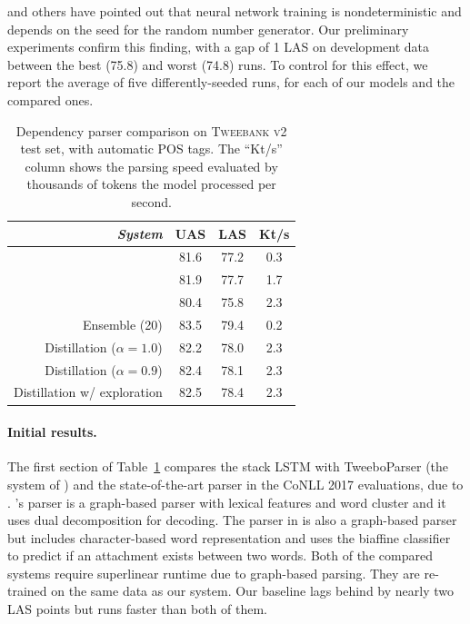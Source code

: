\documentclass[11pt,a4paper]{article}
\begin{document}
\citet{reimers-gurevych:2017:EMNLP2017} and others have
pointed out that neural network training is 
nondeterministic and depends on the seed for the random
number generator.
Our preliminary experiments confirm this finding, with a gap of 1 LAS on development data
between the best (75.8)
 and worst (74.8) runs. To control for this
effect, we report the average of five differently-seeded runs, for
each of our models and the compared ones.

\begin{table}[t]
	\centering
	\begin{tabular}{rccc}
		\hline
		\it System & UAS & LAS & Kt/s \\
		\hline
		\citet{kong-EtAl:2014:EMNLP2014} &81.6 & 77.2 & 0.3 \\
		\citet{dozat-qi-manning:2017:K17-3} & 81.9 &  77.7 & 1.7 \\
		\newcite{ballesteros-EtAl:2016:EMNLP2016} & 80.4 & 75.8 & 2.3 \\
		\hdashline
		Ensemble (20) & 83.5 & 79.4 & 0.2 \\
		Distillation ($\alpha =1.0$) & 82.2 & 78.0 & 2.3 \\
		Distillation ($\alpha =0.9$) & 82.4 & 78.1 & 2.3 \\		
		Distillation w/ exploration & 82.5 & 78.4 & 2.3 \\
		\hline
	\end{tabular}
	\caption{Dependency parser comparison on \textsc{Tweebank v2} test set,
           with automatic POS tags. The ``Kt/s'' column shows
           the parsing speed evaluated by thousands of tokens
           the model processed per second.
            \label{tbl:parse-result}}
\end{table}

\paragraph{Initial results.}  The first section of Table~\ref{tbl:parse-result} compares
the stack LSTM with {\sc TweeboParser} (the system 
of \citealp{kong-EtAl:2014:EMNLP2014}) and the state-of-the-art parser
in the CoNLL 2017 evaluations, due to
 \citet{dozat-qi-manning:2017:K17-3}.
 \citet{kong-EtAl:2014:EMNLP2014}'s parser is a graph-based
parser with lexical features and word cluster and it uses dual decomposition
for decoding. The parser in \citet{dozat-qi-manning:2017:K17-3} is also a graph-based parser
but includes character-based word representation and uses the biaffine classifier
to predict if an attachment exists between two words.
Both of the compared systems require superlinear runtime due to graph-based parsing. 
They are re-trained on the same data as our
system.
Our baseline lags behind by nearly two LAS
points but runs faster than both of them.
\end{document}
